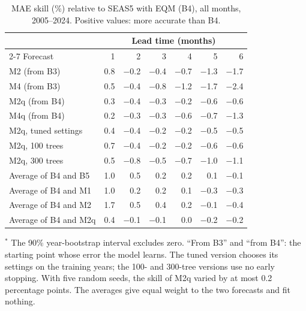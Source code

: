\begin{table}[!htbp]\centering\small
\caption{MAE skill (\%) relative to SEAS5 with EQM (B4), all months, 2005--2024. Positive values: more accurate than B4.}\label{tab:robust}
\begin{tabular}{@{}lrrrrrr@{}}
\toprule
 & \multicolumn{6}{c}{Lead time (months)} \\ \cmidrule(l){2-7}
Forecast & 1 & 2 & 3 & 4 & 5 & 6 \\
\midrule
M2 (from B3) & 0.8 & −0.2 & −0.4 & −0.7 & −1.3\rlap{$^{*}$} & −1.7\rlap{$^{*}$} \\
M4 (from B3) & 0.5 & −0.4 & −0.8 & −1.2\rlap{$^{*}$} & −1.7\rlap{$^{*}$} & −2.4\rlap{$^{*}$} \\
M2q (from B4) & 0.3 & −0.4 & −0.3 & −0.2 & −0.6 & −0.6\rlap{$^{*}$} \\
M4q (from B4) & 0.2 & −0.3 & −0.3 & −0.6\rlap{$^{*}$} & −0.7\rlap{$^{*}$} & −1.3\rlap{$^{*}$} \\
M2q, tuned settings & 0.4 & −0.4 & −0.2 & −0.2 & −0.5 & −0.5 \\
M2q, 100 trees & 0.7\rlap{$^{*}$} & −0.4 & −0.2 & −0.2 & −0.6 & −0.6 \\
M2q, 300 trees & 0.5 & −0.8 & −0.5 & −0.7 & −1.0 & −1.1 \\
\midrule
Average of B4 and B5 & 1.0\rlap{$^{*}$} & 0.5\rlap{$^{*}$} & 0.2 & 0.2 & 0.1 & −0.1 \\
Average of B4 and M1 & 1.0\rlap{$^{*}$} & 0.2 & 0.2 & 0.1 & −0.3 & −0.3 \\
Average of B4 and M2 & 1.7\rlap{$^{*}$} & 0.5\rlap{$^{*}$} & 0.4 & 0.2 & −0.1 & −0.4 \\
Average of B4 and M2q & 0.4\rlap{$^{*}$} & −0.1 & −0.1 & 0.0 & −0.2 & −0.2 \\
\bottomrule
\end{tabular}

\smallskip\parbox{\linewidth}{\footnotesize $^{*}$ The 90\% year-bootstrap interval excludes zero. ``From B3'' and ``from B4'': the starting point whose error the model learns. The tuned version chooses its settings on the training years; the 100- and 300-tree versions use no early stopping. With five random seeds, the skill of M2q varied by at most 0.2 percentage points. The averages give equal weight to the two forecasts and fit nothing.}
\end{table}
